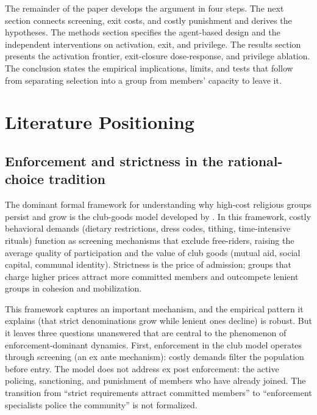 \documentclass[12pt]{article}
\begin{document}
The remainder of the paper develops the argument in four steps. The next section connects screening, exit costs, and costly punishment and derives the hypotheses. The methods section specifies the agent-based design and the independent interventions on activation, exit, and privilege. The results section presents the activation frontier, exit-closure dose-response, and privilege ablation. The conclusion states the empirical implications, limits, and tests that follow from separating selection into a group from members' capacity to leave it.

\section{Literature Positioning}

\subsection{Enforcement and strictness in the rational-choice tradition}

The dominant formal framework for understanding why high-cost religious groups persist and grow is the club-goods model developed by \citet{iannaccone1992,iannaccone1994}. In this framework, costly behavioral demands (dietary restrictions, dress codes, tithing, time-intensive rituals) function as screening mechanisms that exclude free-riders, raising the average quality of participation and the value of club goods (mutual aid, social capital, communal identity). Strictness is the price of admission; groups that charge higher prices attract more committed members and outcompete lenient groups in cohesion and mobilization.

This framework captures an important mechanism, and the empirical pattern it explains (that strict denominations grow while lenient ones decline) is robust. But it leaves three questions unanswered that are central to the phenomenon of enforcement-dominant dynamics. First, enforcement in the club model operates through screening (an ex ante mechanism): costly demands filter the population before entry. The model does not address ex post enforcement: the active policing, sanctioning, and punishment of members who have already joined. The transition from ``strict requirements attract committed members'' to ``enforcement specialists police the community'' is not formalized.
\end{document}
